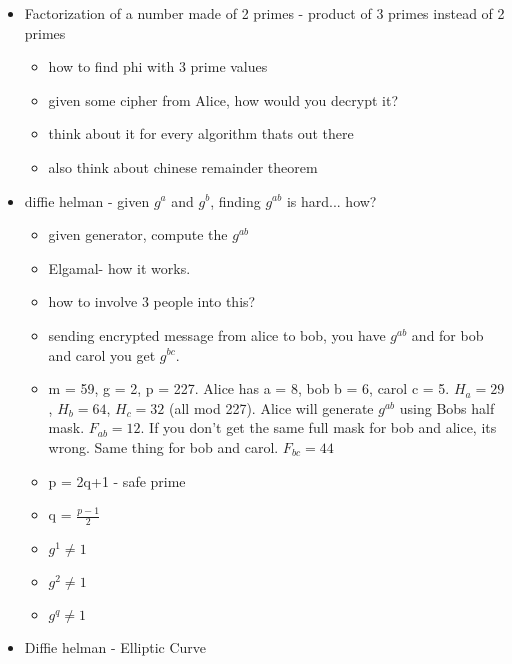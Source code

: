 \documentclass[12pt]{amsart}
\begin{document}
\begin{itemize}
\item{}Factorization of a number made of 2 primes - product of 3 primes instead of 2 primes\\
	\begin{itemize}
	\item{}how to find phi with 3 prime values\\
	\item{}given some cipher from Alice, how would you decrypt it?\\
	\item{}think about it for every algorithm thats out there\\
	\item{}also think about chinese remainder theorem\\
	\end{itemize}
\item{}diffie helman - given $g^a$ and $g^b$, finding $g^{ab}$ is hard... how?\\
	\begin{itemize}
	\item{}given generator, compute the $g^{ab}$\\
	\item{}Elgamal- how it works.\\
	\item{}how to involve 3 people into this?\\
	\item{}sending encrypted message from alice to bob, you have $g^{ab}$ and for bob and carol you get $g^{bc}$.\\
	\item{}m = 59, g = 2, p = 227.  Alice has a = 8, bob b = 6, carol c = 5.  $H_a = 29$, $H_b = 64$, $H_c = 32$ (all mod 227).  Alice will generate $g^{ab}$ using Bobs half mask. $F_{ab} = 12$.  If you don't get the same full mask for bob and alice, its wrong.  Same thing for bob and carol.  $F_{bc} = 44$\\
	\item{}p = 2q+1 - safe prime\
	\item{}q = $\frac{p-1}{2}$\\
	\item{}$g^1 \neq 1$\\
	\item{}$g^2 \neq 1$\\
	\item{}$g^q \neq 1$\\
	\end{itemize}
\item{}Diffie helman - Elliptic Curve\\

\end{itemize}
\end{document}
